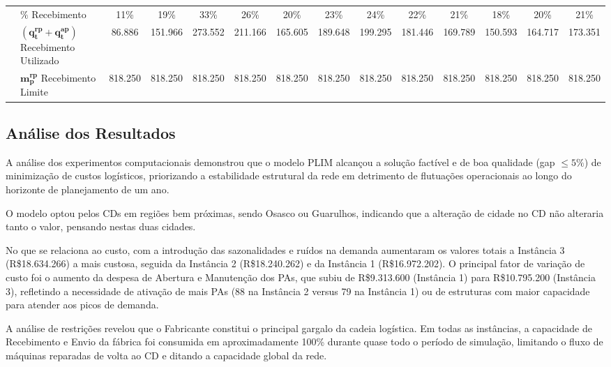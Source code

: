 \begin{table}
{\begin{tabular}{|l|l|c|c|c|c|c|c|c|c|c|c|c|c|}
& $\mathbf{\%}$ Recebimento & 11\% & 19\% & 33\% & 26\% & 20\% & 23\% & 24\% & 22\% & 21\% & 18\% & 20\% & 21\% \\\cline{2-14}
& $(\mathbf{q^{rp}_{t} + q^{ap}_{t}})$ Recebimento Utilizado & 86.886 & 151.966 & 273.552 & 211.166 & 165.605 & 189.648 & 199.295 & 181.446 & 169.789 & 150.593 & 164.717 & 173.351 \\\cline{2-14}
& $\mathbf{m^{rp}_{p}}$ Recebimento Limite & 818.250 & 818.250 & 818.250 & 818.250 & 818.250 & 818.250 & 818.250 & 818.250 & 818.250 & 818.250 & 818.250 & 818.250 \\
\hline
\end{tabular}%
}
\fdadospesquisa
\end{table}

\subsection[Análise dos Resultados]{Análise dos Resultados}
\label{Analise_dos_Resultados}

A análise dos experimentos computacionais demonstrou que o modelo PLIM alcançou a solução factível e de boa qualidade (gap $\leq 5\%$) de minimização de custos logísticos, priorizando a estabilidade estrutural da rede em detrimento de flutuações operacionais ao longo do horizonte de planejamento de um ano.

O modelo optou pelos CDs em regiões bem próximas, sendo Osasco ou Guarulhos, indicando que a alteração de cidade no CD não alteraria tanto o valor, pensando nestas duas cidades.

No que se relaciona ao custo, com a introdução das sazonalidades e ruídos na demanda aumentaram os valores totais a Instância 3 (R\$18.634.266) a mais custosa, seguida da Instância 2 (R\$18.240.262) e da Instância 1 (R\$16.972.202). O principal fator de variação de custo foi o aumento da despesa de Abertura e Manutenção dos PAs, que subiu de R\$9.313.600 (Instância 1) para R\$10.795.200 (Instância 3), refletindo a necessidade de ativação de mais PAs (88 na Instância 2 versus 79 na Instância 1) ou de estruturas com maior capacidade para atender aos picos de demanda.

A análise de restrições revelou que o Fabricante constitui o principal gargalo da cadeia logística. Em todas as instâncias, a capacidade de Recebimento e Envio da fábrica foi consumida em aproximadamente 100\% durante quase todo o período de simulação, limitando o fluxo de máquinas reparadas de volta ao CD e ditando a capacidade global da rede.

